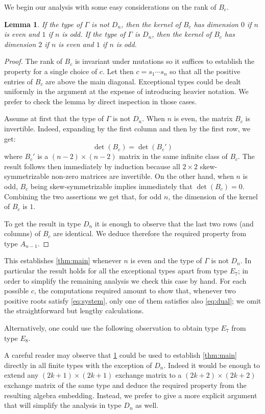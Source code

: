 \documentclass[pdftex]{sigma}
\numberwithin{equation}{section}
\numberwithin{figure}{section}
\newtheorem{Lemma}[Theorem]{Lemma}
\begin{document}
  We begin our analysis with some easy considerations on the rank of $B_c$.
  \begin{Lemma}
    \label{lem:dimensions}
    If the type of $\Gamma$ is not $D_n$, then the kernel of $B_c$ has dimension $0$ if $n$ is even and $1$ if $n$ is odd.
    If the type of $\Gamma$ is $D_n$, then the kernel of $B_c$ has dimension $2$ if $n$ is even and $1$ if $n$ is odd.
  \end{Lemma}
  \begin{proof}
    The rank of $B_c$ is invariant under mutations so it suffices to establish the property for a single choice of $c$.
    Let then $c=s_1\cdots s_n$ so that all the positive entries of $B_c$ are above the main diagonal.
    Exceptional types could be dealt uniformly in the argument at the expense of introducing heavier notation.
    We prefer to check the lemma by direct inspection in those cases.

    Assume at first that the type of $\Gamma$ is not $D_n$.
    When $n$ is even, the matrix $B_c$ is invertible.
    Indeed, expanding by the first column and then by the first row, we get:
    \[
      \det(B_c)=\det(B_c')
    \]
    where $B_c'$ is a $(n-2)\times(n-2)$ matrix in the same infinite class of $B_c$.
    The result follows then immediately by induction because all $2\times2$ skew-symmetrizable non-zero matrices are invertible.
    On the other hand, when $n$ is odd, $B_c$ being skew-symmetrizable implies immediately that $\det(B_c)=0$.
    Combining the two assertions we get that, for odd $n$, the dimension of the kernel of $B_c$ is $1$.

    To get the result in type $D_n$ it is enough to observe that the last two rows (and columns) of $B_c$ are identical.
    We deduce therefore the required property from type $A_{n-1}$.
  \end{proof}

  This establishes \cref{thm:main} whenever $n$ is even and the type of $\Gamma$ is not $D_n$.
  In particular the result holds for all the exceptional types apart from type $E_7$; in order to simplify the remaining analysis we check this case by hand.
  For each possible $c$, the computations required amount to show that, whenever two positive roots satisfy \cref{eq:system}, only one of them satisfies also \cref{eq:dual}; we omit the straightforward but lengthy calculations.

  Alternatively, one could use the following observation to obtain type $E_7$ from type $E_8$.

  \begin{Remark}
    \label{rk:induction}
    A careful reader may observe that \cref{lem:dimensions} could be used to establish \cref{thm:main} directly in all finite types with the exception of $D_n$.
    Indeed it would be enough to extend any $(2k+1) \times (2k+1)$ exchange matrix to a $(2k+2) \times (2k+2)$ exchange matrix of the same type and deduce the required property from the resulting algebra embedding.
    Instead, we prefer to give a more explicit argument that will simplify the analysis in type $D_n$ as well.
  \end{Remark}
\end{document}
